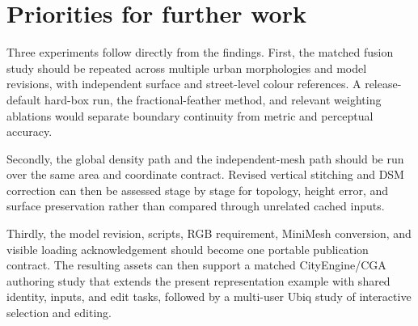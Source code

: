 \section{Priorities for further work}

Three experiments follow directly from the findings.  First, the matched
fusion study should be repeated across multiple urban morphologies and model
revisions, with independent surface and street-level colour references.  A
release-default hard-box run, the fractional-feather method, and relevant
weighting ablations would separate boundary continuity from metric and
perceptual accuracy.

Secondly, the global density path and the independent-mesh path should be run
over the same area and coordinate contract.  Revised vertical stitching and
DSM correction can then be assessed stage by stage for topology, height error,
and surface preservation rather than compared through unrelated cached inputs.

Thirdly, the model revision, scripts, RGB requirement, MiniMesh conversion,
and visible loading acknowledgement should become one portable publication
contract.  The resulting assets can then support a matched CityEngine/CGA
authoring study that extends the present representation example with shared
identity, inputs, and edit tasks, followed by a multi-user Ubiq study of
interactive selection and editing.
